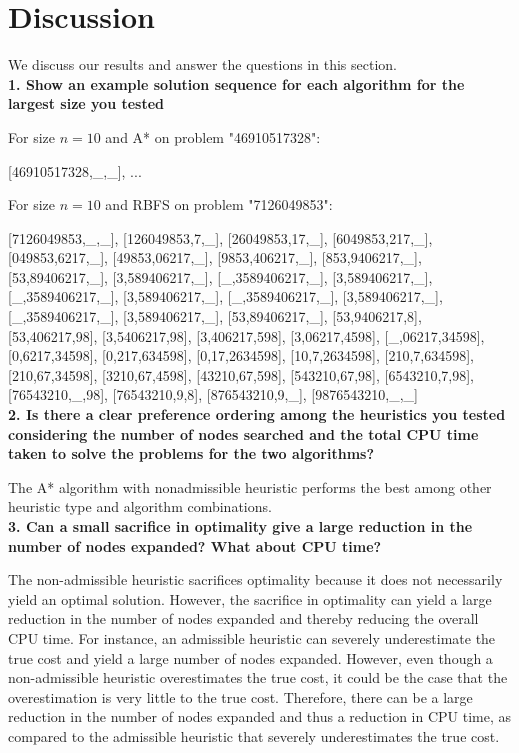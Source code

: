 \section{Discussion}

We discuss our results and answer the questions in this section.\\

\textbf{1. Show an example solution sequence for each algorithm for the largest size you tested}

For size $n = 10$ and A* on problem "46910517328":

[46910517328,\_,\_], ...

For size $n = 10$ and RBFS on problem "7126049853":

[7126049853,\_,\_], [126049853,7,\_], [26049853,17,\_], [6049853,217,\_], [049853,6217,\_], [49853,06217,\_], [9853,406217,\_], [853,9406217,\_], [53,89406217,\_], [3,589406217,\_], [\_,3589406217,\_], [3,589406217,\_], [\_,3589406217,\_], [3,589406217,\_], [\_,3589406217,\_], [3,589406217,\_], [\_,3589406217,\_], [3,589406217,\_], [53,89406217,\_], [53,9406217,8], [53,406217,98], [3,5406217,98], [3,406217,598], [3,06217,4598], [\_,06217,34598], [0,6217,34598], [0,217,634598], [0,17,2634598], [10,7,2634598], [210,7,634598], [210,67,34598], [3210,67,4598], [43210,67,598], [543210,67,98], [6543210,7,98], [76543210,\_,98], [76543210,9,8], [876543210,9,\_], [9876543210,\_,\_] \\

\textbf{2. Is there a clear preference ordering among the heuristics you tested considering the number of nodes searched and the total CPU time taken to solve the problems for the two algorithms?}

The A* algorithm with nonadmissible heuristic performs the best among other heuristic type and algorithm combinations.\\

\textbf{3. Can a small sacrifice in optimality give a large reduction in the number of nodes expanded? What about CPU time?}

The non-admissible heuristic sacrifices optimality because it does not necessarily yield an optimal solution. However, the sacrifice in optimality can yield a large reduction in the number of nodes expanded and thereby reducing the overall CPU time. For instance, an admissible heuristic can severely underestimate the true cost and yield a large number of nodes expanded. However, even though a non-admissible heuristic overestimates the true cost, it could be the case that the overestimation is very little to the true cost. Therefore, there can be a large reduction in the number of nodes expanded and thus a reduction in CPU time, as compared to the admissible heuristic that severely underestimates the true cost.\\

